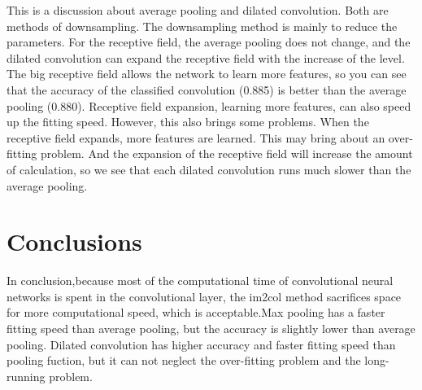 \documentclass{article}
\begin{document}
This is a discussion about average pooling and dilated convolution. Both are methods of downsampling. The downsampling method is mainly to reduce the parameters. For the receptive field, the average pooling does not change, and the dilated convolution can expand the receptive field with the increase of the level\cite{DumoulinVincent2016Agtc}. The big receptive field allows the network to learn more features, so you can see that the accuracy of the classified convolution (0.885) is better than the average pooling (0.880). Receptive field expansion, learning more features, can also speed up the fitting speed. However, this also brings some problems. When the receptive field expands, more features are learned. This may bring about an over-fitting problem. And the expansion of the receptive field will increase the amount of calculation, so we see that each dilated convolution runs much slower than the average pooling.






\section{Conclusions}
\label{sec:concl}
In conclusion,because most of the computational time of convolutional neural networks is spent in the convolutional layer, the im2col method sacrifices space for more computational speed, which is acceptable.Max pooling has a faster fitting speed than average pooling, but the accuracy is slightly lower than average pooling. Dilated convolution has higher accuracy and faster fitting speed than pooling fuction, but it can not neglect the over-fitting problem and the long-running problem.



\end{document}
